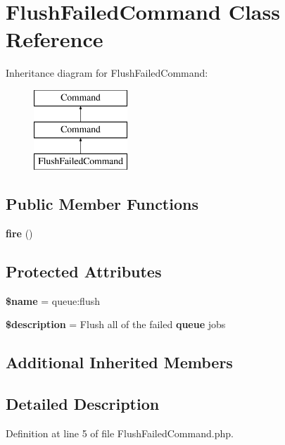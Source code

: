 \section{Flush\+Failed\+Command Class Reference}
\label{class_illuminate_1_1_queue_1_1_console_1_1_flush_failed_command}
Inheritance diagram for Flush\+Failed\+Command\+:\begin{figure}[H]
\begin{center}
\leavevmode
\includegraphics[height=3.000000cm]{class_illuminate_1_1_queue_1_1_console_1_1_flush_failed_command}
\end{center}
\end{figure}
\subsection*{Public Member Functions}
\begin{DoxyCompactItemize}
\item 
{\bf fire} ()
\end{DoxyCompactItemize}
\subsection*{Protected Attributes}
\begin{DoxyCompactItemize}
\item 
{\bf \$name} = \textquotesingle{}queue\+:flush\textquotesingle{}
\item 
{\bf \$description} = \textquotesingle{}Flush all of the failed {\bf queue} jobs\textquotesingle{}
\end{DoxyCompactItemize}
\subsection*{Additional Inherited Members}


\subsection{Detailed Description}


Definition at line 5 of file Flush\+Failed\+Command.\+php.



